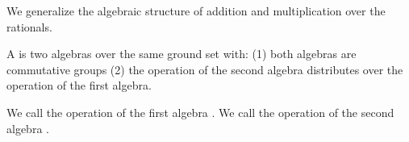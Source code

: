 \sbasic


\sstart



We generalize the algebraic structure of
addition and multiplication over the
rationals.


A  is two algebras over
the same ground set with:
(1) both algebras are commutative groups
(2) the operation of the second algebra
distributes over the operation of the first
algebra.

We call the operation of the first algebra
.
We call the operation of the second algebra
.



\strats
